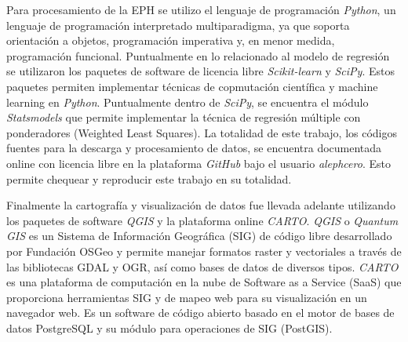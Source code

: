 Para procesamiento de la EPH se utilizo el lenguaje de programación \textit{Python}, un lenguaje de programación interpretado multiparadigma, ya que soporta orientación a objetos, programación imperativa y, en menor medida, programación funcional. Puntualmente en lo relacionado al modelo de regresión se utilizaron los paquetes de software de licencia libre \textit{Scikit-learn} y \textit{SciPy}. Estos paquetes permiten implementar técnicas de copmutación científica y machine learning en \textit{Python}. Puntualmente dentro de \textit{SciPy}, se encuentra el módulo \textit{Statsmodels} que permite implementar la técnica de regresión múltiple con ponderadores (Weighted Least Squares). La totalidad de este trabajo, los códigos fuentes para la descarga y procesamiento de datos, se encuentra documentada online con licencia libre en la plataforma \textit{GitHub} bajo el usuario \textit{alephcero}. Esto permite chequear y reproducir este trabajo en su totalidad.


Finalmente la cartografía y visualización de datos fue llevada adelante utilizando los paquetes de software \textit{QGIS} y la plataforma online \textit{CARTO}. \textit{QGIS} o \textit{Quantum GIS} es un Sistema de Información Geográfica (SIG) de código libre desarrollado por Fundación OSGeo y permite manejar formatos raster y vectoriales a través de las bibliotecas GDAL y OGR, así como bases de datos de diversos tipos. \textit{CARTO}  es una plataforma de computación en la nube de Software as a Service (SaaS) que proporciona herramientas SIG y de mapeo web para su visualización en un navegador web. Es un software de código abierto basado en el motor de bases de datos PostgreSQL  y su módulo para operaciones de SIG (PostGIS). 

